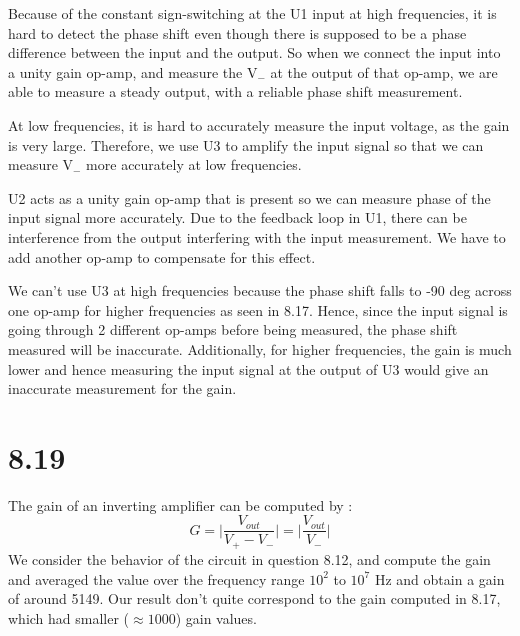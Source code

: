 \documentclass[authoryear, 12pt,5p, times]{elsarticle}
\begin{document}
\par Because of the constant sign-switching at the U1 input at  high frequencies, it is hard to detect the phase shift even though there is supposed to be a phase difference between the input and the output. So when we connect the input into a unity gain op-amp, and measure the V$_{-}$ at the output of that op-amp, we are able to measure a steady output, with a reliable phase shift measurement.
\par At low frequencies, it is hard to accurately measure the input voltage, as the gain is very large. Therefore, we use U3 to amplify the input signal so that we can measure V$_{-}$ more accurately at low frequencies. 
\par U2 acts as a unity gain op-amp that is present so we can measure phase of the input signal more accurately. Due to the feedback loop in U1, there can be interference from the output interfering with the input measurement. We have to add another op-amp to compensate for this effect. 
\par We can’t use U3 at high frequencies because the phase shift falls to -90 deg across one op-amp for higher frequencies as seen in 8.17. Hence, since the input signal is going through 2 different op-amps before being measured, the phase shift measured will be inaccurate. Additionally, for higher frequencies, the gain is much lower and hence measuring the input signal at the output of U3 would give an inaccurate measurement for the gain. 
\section*{8.19}
The gain of an inverting amplifier can be computed by : 
\begin{equation}
G = \Bigg |\frac{V_{out}}{V_+ - V_-}\Bigg |=\Bigg |\frac{V_{out}}{ V_-}\Bigg |
\end{equation} 
We consider the behavior of the circuit in question 8.12, and compute the gain and averaged the value over the frequency range $10^2$ to $10^7$ Hz and obtain a gain of around 5149. Our result don't quite correspond to the gain computed in 8.17, which had smaller ($\approx 1000$) gain values.
\end{document}
